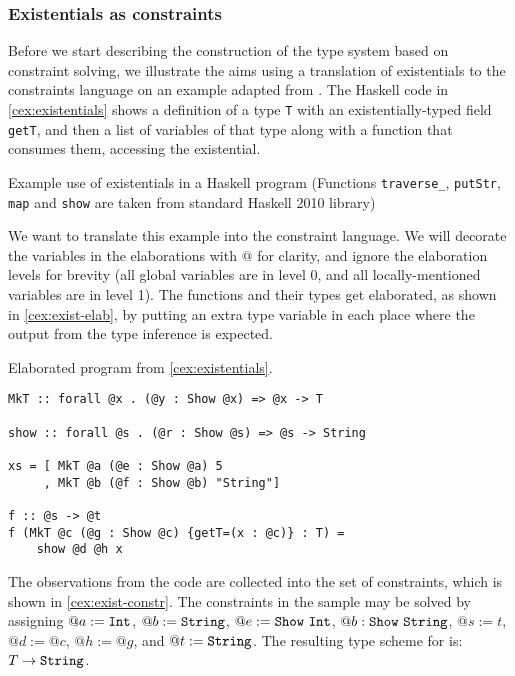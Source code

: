\subsubsection{Existentials as constraints}

Before we start describing the construction of the type system based on constraint solving, we illustrate the aims using a translation of existentials to the constraints language on an example adapted from \citet{peytonjones2019type}.
The Haskell code in \cref{cex:existentials} shows a definition of a type \lstinline{T} with an existentially-typed field \lstinline{getT}, and then a list of variables of that type along with a function that consumes them, accessing the existential.

\begin{codex}

\caption{Example use of existentials in a Haskell program (Functions \texttt{traverse\_}, \texttt{putStr}, \texttt{map} and \texttt{show} are taken from standard Haskell 2010 library)}
\label{cex:existentials}
\end{codex}

We want to translate this example into the constraint language. We will decorate the variables in the elaborations with $@$ for clarity, and ignore the elaboration levels for brevity (all global variables are in level 0, and all locally-mentioned variables are in level 1). The functions and their types get elaborated, as shown in \cref{cex:exist-elab}, by putting an extra type variable in each place where the output from the type inference is expected.


\begin{codex}
\caption{Elaborated program from \cref{cex:existentials}.}
\label{cex:exist-elab}
\begin{lstlisting}[style=haskellStyle]
MkT :: forall @x . (@y : Show @x) => @x -> T

show :: forall @s . (@r : Show @s) => @s -> String

xs = [ MkT @a (@e : Show @a) 5
     , MkT @b (@f : Show @b) "String"]

f :: @s -> @t
f (MkT @c (@g : Show @c) {getT=(x : @c)} : T) =
    show @d @h x
\end{lstlisting}
\end{codex}

The observations from the code are collected into the set of constraints, which is shown in \cref{cex:exist-constr}. The constraints in the sample may be solved by assigning $@a := \mathtt{Int}$, $@b := \mathtt{String}$, $@e := \mathtt{Show}\ \mathtt{Int}$, $@b : \mathtt{Show}\ \mathtt{String}$, $@s := t$, $@d := @c$, $@h := @g$, and $@t := \mathtt{String}$. The resulting type scheme for  is: $T \to \mathtt{String}$.

